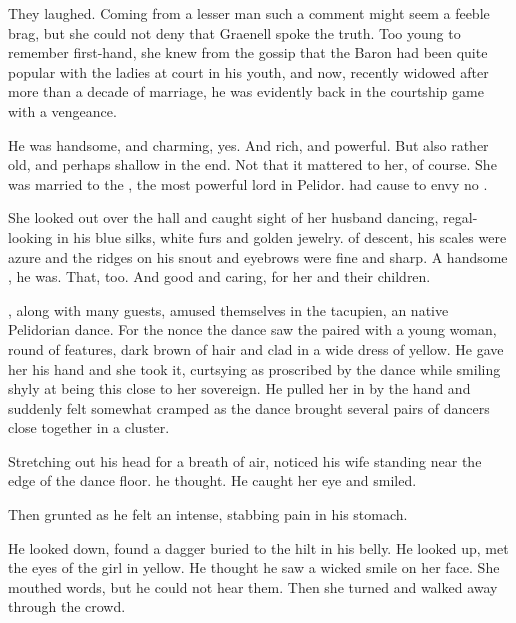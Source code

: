 They laughed. Coming from a lesser man such a comment might seem a feeble brag, but she could not deny that Graenell spoke the truth. Too young to remember first-hand, she knew from the gossip that the Baron had been quite popular with the ladies at court in his youth, and now, recently widowed after more than a decade of marriage, he was evidently back in the courtship game with a vengeance. 

He was handsome, and charming, yes. And rich, and powerful. But also rather old, and perhaps shallow in the end. Not that it mattered to her, of course. She was married to the \rayuth, the most powerful lord in Pelidor. \Tiroco{} had cause to envy no \sphyle. 

She looked out over the hall and caught sight of her husband dancing, regal-looking in his blue silks, white furs and golden jewelry. \Tepharin{} of descent, his scales were azure and the ridges on his snout and eyebrows were fine and sharp. A handsome \dax, he was. That, too. And good and caring, for her and their children. 

\Rayuth[\Icor], along with many guests, amused themselves in the tacupien, an native Pelidorian dance. For the nonce the dance saw the \rayuth paired with a young woman, round of features, dark brown of hair and clad in a wide dress of yellow. He gave her his hand and she took it, curtsying as proscribed by the dance while smiling shyly at being this close to her sovereign. He pulled her in by the hand and suddenly felt somewhat cramped as the dance brought several pairs of dancers close together in a cluster. 

Stretching out his head for a breath of air, \Icor{} noticed his wife standing near the edge of the dance floor. 
 he thought. He caught her eye and smiled. 


Then grunted as he felt an intense, stabbing pain in his stomach. 

He looked down, found a dagger buried to the hilt in his belly. He looked up, met the eyes of the girl in yellow. He thought he saw a wicked smile on her face. She mouthed words, but he could not hear them. Then she turned and walked away through the crowd. 

